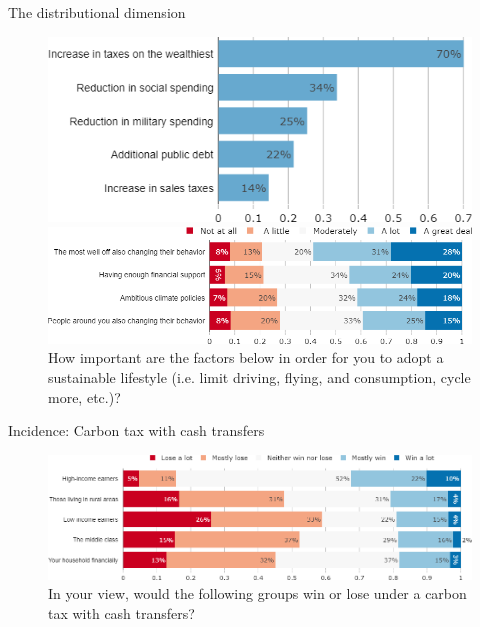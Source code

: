 \begin{framefont}{\small}
\begin{frame}{The distributional dimension}
\begin{figure}
	\vspace{-.2cm}
	\caption{%
	What sources of funding do you find appropriate for public investments in green infrastructure? (Multiple answers are possible)}
	\vspace{-.4cm}
	\includegraphics[width=.45\paperwidth]{../figures/FR/investments_funding_FR.png}
	\caption{How important are the factors below in order for you to adopt a sustainable lifestyle (i.e. limit driving, flying, and consumption, cycle more, etc.)?}
	\vspace{-.4cm}
	\includegraphics[width=.7\paperwidth]{../figures/FR/condition_FR.png}
\end{figure}
\end{frame}

\begin{frame}{Incidence: Carbon tax with cash transfers}%
	\begin{figure}[h!]
	\centering
	\caption{In your view, would the following groups win or lose under a carbon tax with cash transfers?}
	\includegraphics[width=.87\paperwidth]{../figures/FR/tax_transfers_win_lose_FR.png}
	\end{figure}
\end{frame}


\end{framefont}
